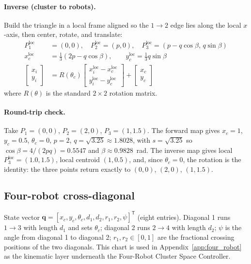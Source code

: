 \documentclass[12pt, letterpaper, oneside]{report}
\begin{document}
\paragraph{Inverse (cluster to robots).}
Build the triangle in a local frame aligned so the $1\to2$ edge lies along
the local $x$-axis, then center, rotate, and translate:
\begin{align}
P_1^{\text{loc}} &= (0,0), \quad P_2^{\text{loc}} = (p,0), \quad
P_3^{\text{loc}} = (p-q\cos\beta,\, q\sin\beta) \\
x_c^{\text{loc}} &= \tfrac{1}{3}(2p-q\cos\beta), \qquad y_c^{\text{loc}} = \tfrac{1}{3}q\sin\beta \\
\begin{bmatrix} x_i \\ y_i \end{bmatrix} &= R(\theta_c)
  \begin{bmatrix} x_i^{\text{loc}} - x_c^{\text{loc}} \\ y_i^{\text{loc}} - y_c^{\text{loc}} \end{bmatrix}
  + \begin{bmatrix} x_c \\ y_c \end{bmatrix}
\end{align}
where $R(\theta)$ is the standard $2\times2$ rotation matrix.

\paragraph{Round-trip check.} Take $P_1=(0,0)$, $P_2=(2,0)$, $P_3=(1,1.5)$.
The forward map gives $x_c=1$, $y_c=0.5$, $\theta_c=0$, $p=2$,
$q=\sqrt{3.25}\approx1.8028$, with $s=\sqrt{3.25}$ so
$\cos\beta = 4/(2pq) = 0.5547$ and $\beta\approx0.9828$~rad. The inverse map
gives local $P_3^{\text{loc}}=(1.0,1.5)$, local centroid $(1,0.5)$, and,
since $\theta_c=0$, the rotation is the identity: the three points return
exactly to $(0,0)$, $(2,0)$, $(1,1.5)$.

\subsection{Four-robot cross-diagonal}
\label{sec:atom_xdiag}

State vector $\mathbf{q}=[x_c,y_c,\theta_c,d_1,d_2,r_1,r_2,\psi]^{\mathsf T}$
(eight entries). Diagonal 1 runs $1\to3$ with length $d_1$ and sets
$\theta_c$; diagonal 2 runs $2\to4$ with length $d_2$; $\psi$ is the angle
from diagonal 1 to diagonal 2; $r_1,r_2\in[0,1]$ are the fractional crossing
positions of the two diagonals. This chart is used in
Appendix~\ref{app:four_robot} as the kinematic layer underneath the
Four-Robot Cluster Space Controller.
\end{document}

